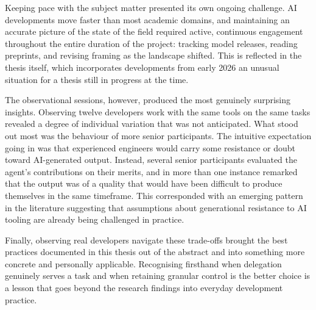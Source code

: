 Keeping pace with the subject matter presented its own ongoing challenge. AI developments move faster than most academic domains, and maintaining an accurate picture of the state of the field required active, continuous engagement throughout the entire duration of the project: tracking model releases, reading preprints, and revising framing as the landscape shifted. This is reflected in the thesis itself, which incorporates developments from early 2026 an unusual situation for a thesis still in progress at the time.

The observational sessions, however, produced the most genuinely surprising insights. Observing twelve developers work with the same tools on the same tasks revealed a degree of individual variation that was not anticipated. What stood out most was the behaviour of more senior participants. The intuitive expectation going in was that experienced engineers would carry some resistance or doubt toward AI-generated output. Instead, several senior participants evaluated the agent's contributions on their merits, and in more than one instance remarked that the output was of a quality that would have been difficult to produce themselves in the same timeframe. This corresponded with an emerging pattern in the literature suggesting that assumptions about generational resistance to AI tooling are already being challenged in practice.

Finally, observing real developers navigate these trade-offs brought the best practices documented in this thesis out of the abstract and into something more concrete and personally applicable. Recognising firsthand when delegation genuinely serves a task and when retaining granular control is the better choice is a lesson that goes beyond the research findings into everyday development practice.
